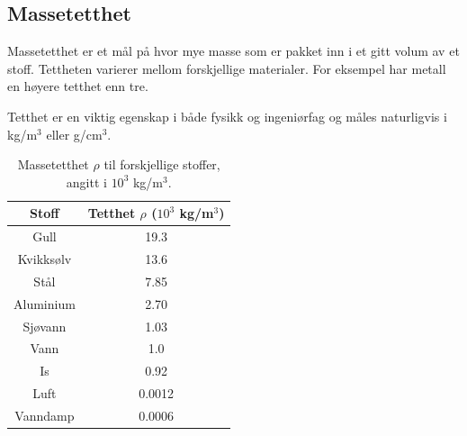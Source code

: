 \subsection{Massetetthet}

Massetetthet er et mål på hvor mye masse som er pakket inn i et gitt volum av et stoff. Tettheten varierer mellom forskjellige materialer. For eksempel har metall en høyere tetthet enn tre.

Tetthet er en viktig egenskap i både fysikk og ingeniørfag og måles naturligvis i kg/m\(^3\) eller g/cm\(^3\).



\begin{table}[h!]
    \centering
    \begin{tabular}{|c|c|}
        \hline
        \textbf{Stoff} & \textbf{Tetthet \( \rho \) (\(10^3\) kg/m\(^3\))} \\
        \hline
        Gull & 19.3 \\
        \hline
        Kvikksølv & 13.6 \\
        \hline
        Stål & 7.85 \\
        \hline
        Aluminium & 2.70 \\
        \hline
        Sjøvann & 1.03 \\
        \hline
        Vann & 1.0 \\
        \hline
        Is & 0.92 \\
        \hline
        Luft & 0.0012 \\
        \hline
        Vanndamp & 0.0006 \\
        \hline
    \end{tabular}
    \caption{Massetetthet \( \rho \) til forskjellige stoffer, angitt i \( 10^3 \) kg/m\(^3\).}
    \label{tab:massetetthet}
\end{table}


